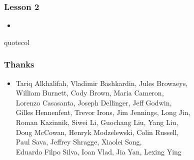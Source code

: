 \begin{frame}
  \MadLogo
  \frametitle{Lesson 2}

\begin{itemize}
\item {}
\end{itemize}

\vfill
\begin{beamercolorbox}[wd=\textwidth,center]{quotecol}
\Large {}
\end{beamercolorbox}
\vfill


\end{frame}


\begin{frame}
\MadLogo
\frametitle{Thanks}

\begin{itemize}
\item Tariq Alkhalifah, Vladimir Bashkardin, Jules Browaeys, \\
William Burnett, Cody Brown, Maria Cameron, \\
Lorenzo Casasanta, Joseph Dellinger, Jeff Godwin, \\
Gilles Hennenfent, Trevor Irons, Jim Jennings, Long Jin, \\
Roman Kazinnik, Siwei Li, Guochang Liu, Yang Liu, \\
Doug McCowan, Henryk Modzelewski, Colin Russell, \\
Paul Sava, Jeffrey Shragge, Xiaolei Song, \\
Eduardo Filpo Silva, Ioan Vlad, Jia Yan, Lexing Ying
\end{itemize}
\end{frame}




